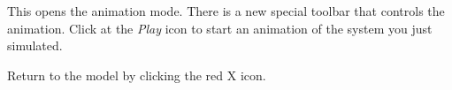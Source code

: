 \documentclass[a4paper]{article}
\begin{document}
\begin{enumerate}

This opens the animation mode. There is a new special toolbar that controls the animation. Click at the \textit{Play} icon to start an animation of the system you just simulated. 


Return to the model by clicking the red X icon.
\end{enumerate}
\end{document}
